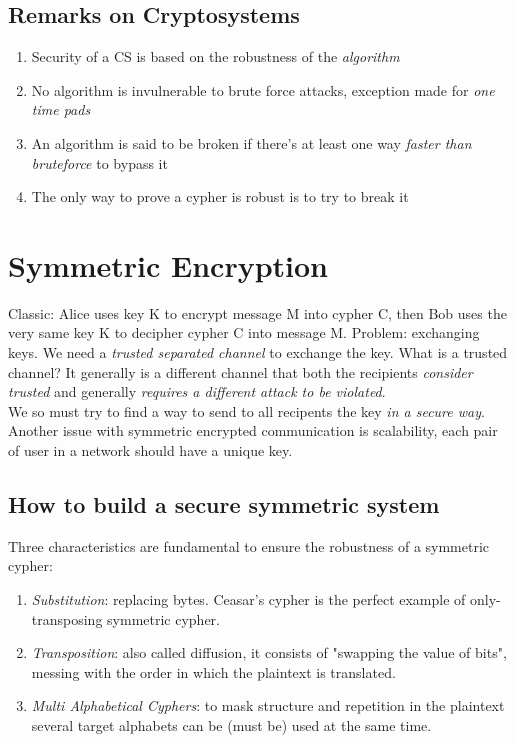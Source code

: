 \documentclass{article}
\begin{document}
			\subsection{Remarks on Cryptosystems}
				\begin{enumerate}
					\item Security of a CS is based on the robustness of the \emph{algorithm}
					\item No algorithm is invulnerable to brute force attacks, exception made for \emph{one time pads}
					\item An algorithm is said to be broken if there's at least one way \emph{faster than bruteforce} to bypass it
					\item The only way to prove a cypher is robust is to try to break it
				\end{enumerate}
		
		\section{Symmetric Encryption}
			Classic: Alice uses key K to encrypt message M into cypher C, then Bob uses the very same key K to decipher cypher C into message M. Problem: exchanging keys. We need a \emph{trusted separated channel} to exchange the key. What is a trusted channel? It generally is a different channel that both the recipients \emph{consider trusted} and generally \emph{requires a different attack to be violated}.\\
			We so must try to find a way to send to all recipents the key \emph{in a secure way}. Another issue with symmetric encrypted communication is scalability, each pair of user in a network should have a unique key. 
			
			\subsection{How to build a secure symmetric system}
				Three characteristics are fundamental to ensure the robustness of a symmetric cypher:
				\begin{enumerate}
					\item \emph{Substitution}: replacing bytes. Ceasar's cypher is the perfect example of only-transposing symmetric cypher.
					\item \emph{Transposition}: also called diffusion, it consists of "swapping the value of bits", messing with the order in which the plaintext is translated.
					\item \emph{Multi Alphabetical Cyphers}: to mask structure and repetition in the plaintext several target alphabets can be (must be) used at the same time.
				\end{enumerate}
				
\end{document}
